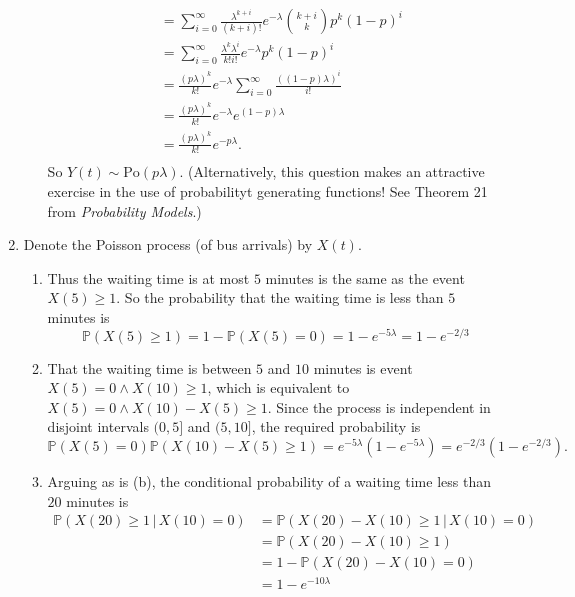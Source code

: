 \documentclass[11pt,a4paper]{article}
\begin{document}
\begin{enumerate}
\begin{enumerate}
\begin{align*}
                &= \sum_{i=0}^\infty \frac{\lambda^{k+i}}{(k+i)!}e^{-\lambda}\binom{k+i}{k}p^k(1-p)^i\\
                &= \sum_{i=0}^\infty \frac{\lambda^k \lambda^i}{k!i!}e^{-\lambda}p^k(1-p)^i\\
                &= \frac{(p\lambda)^k}{k!}e^{-\lambda} \sum_{i=0}^\infty \frac{((1-p)\lambda)^i}{i!}\\
                &= \frac{(p\lambda)^k}{k!}e^{-\lambda}e^{(1-p)\lambda}\\
                &= \frac{(p\lambda)^k}{k!}e^{-p\lambda}.\\
            \end{align*}
            \endgroup
            So $Y(t) \sim \text{Po}(p\lambda)$. (Alternatively, this question makes an attractive exercise in the use of probabilityt generating functions! See Theorem 21 from \textit{Probability Models}.)
        \end{enumerate}
        \item Denote the Poisson process (of bus arrivals) by $X(t)$.
        \begin{enumerate}
            \item Thus the waiting time is at most $5$ minutes is the same as the event $X(5) \geq 1$. So the probability that the waiting time is less than $5$ minutes is
            $$
            \mathbb{P}(X(5) \geq 1) = 1-\mathbb{P}(X(5)=0) = 1- e^{-5\lambda} = 1-e^{-2/3}
            $$
            \item That the waiting time is between $5$ and $10$ minutes is event $X(5)=0\wedge X(10)\geq 1$, which is equivalent to $X(5) = 0\wedge X(10) - X(5) \geq 1$. Since the process is independent in disjoint intervals $(0,5]$ and $(5,10]$, the required probability is
            $$
            \mathbb{P}(X(5) = 0)\mathbb{P}(X(10)-X(5)\geq 1) = e^{-5\lambda}(1-e^{-5\lambda}) = e^{-2/3}(1-e^{-2/3}).
            $$
            \item Arguing as is (b), the conditional probability of a waiting time less than $20$ minutes is
            \begin{align*}
                \mathbb{P}(X(20) \geq 1\, | \, X(10) = 0)
                &= \mathbb{P}(X(20)-X(10)\geq 1\, | \, X(10) = 0)\\
                &= \mathbb{P}(X(20)-X(10)\geq 1)\\
                &= 1-\mathbb{P}(X(20)-X(10)=0)\\
                &= 1-e^{-10\lambda}\\

\end{align*}
\end{enumerate}
\end{enumerate}
\end{document}
